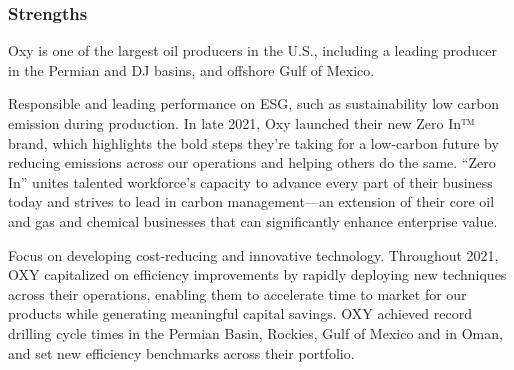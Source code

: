 \documentclass[
	a4paper, %
	12pt,%
]{CSSullivanBusinessReport}
\begin{document}
\begin{fullwidth}
\subsubsection{Strengths}
Oxy is one of the largest oil producers in the U.S., including a leading producer 
in the Permian and DJ basins, and offshore Gulf of Mexico.\par
Responsible and leading performance on ESG, such as sustainability low carbon emission during production. In late 2021, Oxy launched their new Zero In™ brand, which highlights the bold steps they’re taking for a low-carbon future by reducing emissions across our operations and helping others do the same. “Zero In” unites talented workforce’s capacity to advance every part of their business today and strives to lead in carbon management—an extension of their core oil and gas and chemical businesses that can significantly enhance enterprise value.\par
Focus on developing cost-reducing and innovative technology. Throughout 2021, OXY capitalized on efficiency improvements by rapidly deploying new techniques across their operations, enabling them to accelerate time to market for our products while generating meaningful capital savings. OXY achieved record drilling cycle times in the Permian Basin, Rockies, Gulf of Mexico and in Oman, and set new efficiency benchmarks across their portfolio. 

\end{fullwidth}
\end{document}
